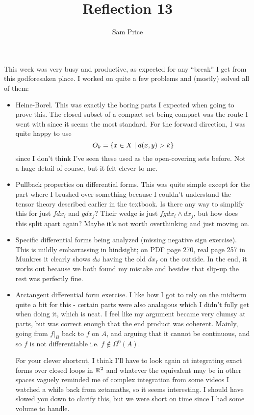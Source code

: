 \documentclass{article}
\author{Sam Price}
\title{Reflection 13}
\begin{document}
\maketitle

This week was very busy and productive, as expected for any ``break'' I get from this godforesaken place.
I worked on quite a few problems and (mostly) solved all of them:
\begin{itemize}
  \item Heine-Borel. This was exactly the boring parts I expected when going to prove this.
        The closed subset of a compact set being compact was the route I went with since it seems the most standard.
        For the forward direction, I was quite happy to use
        \[ O_{k} = \set{ x \in X \mid d(x, y) > k } \]
        since I don't think I've seen these used as the open-covering sets before.
        Not a huge detail of course, but it felt clever to me.
  \item Pullback properties on differential forms.
        This was quite simple except for the part where I brushed over something because I couldn't understand the tensor theory described earlier in the textbook.
        Is there any way to simplify this for just $f dx_{i}$ and $g dx_{j}$? Their wedge is just $fg dx_{i} \wedge dx_{j}$, but how does this split apart again?
        Maybe it's not worth overthinking and just moving on.
  \item Specific differential forms being analyzed (missing negative sign exercise).
        This is mildly embarrassing in hindsight; on PDF page 270, real page 257 in Munkres it clearly shows $d\omega$ having the old $dx_{I}$ on the outside.
        In the end, it works out because we both found my mistake and besides that slip-up the rest was perfectly fine.
  \item Arctangent differential form exercise. I like how I got to rely on the midterm quite a bit for this - certain parts were also analagous which I didn't fully get when
        doing it, which is neat. I feel like my argument became very clumsy at parts, but was correct enough that the end product was coherent.
        Mainly, going from $f|_{B}$ back to $f$ on $A$, and arguing that it cannot be continuous, and so $f$ is not differentiable i.e. $f \notin \Omega^{0}(A)$.

        For your clever shortcut, I think I'll have to look again
        at integrating exact forms over closed loops in $\RR[2]$ and whatever
        the equivalent may be in other spaces \textendash{}
        vaguely reminded me of complex integration
        from some videos I watched a while back from zetamaths,
        so it seems interesting.
        I should have slowed you down to clarify this, but we were short
        on time since I had some volume to handle.


\end{itemize}
\end{document}
